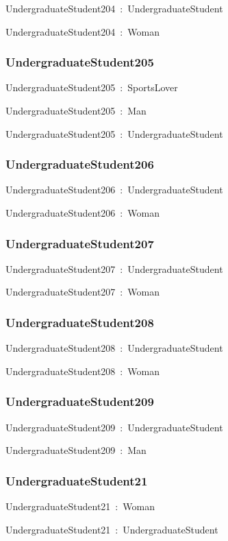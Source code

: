 \documentclass{article}
\begin{document}
UndergraduateStudent204~:~UndergraduateStudent

UndergraduateStudent204~:~Woman

\subsubsection*{UndergraduateStudent205}

UndergraduateStudent205~:~SportsLover

UndergraduateStudent205~:~Man

UndergraduateStudent205~:~UndergraduateStudent

\subsubsection*{UndergraduateStudent206}

UndergraduateStudent206~:~UndergraduateStudent

UndergraduateStudent206~:~Woman

\subsubsection*{UndergraduateStudent207}

UndergraduateStudent207~:~UndergraduateStudent

UndergraduateStudent207~:~Woman

\subsubsection*{UndergraduateStudent208}

UndergraduateStudent208~:~UndergraduateStudent

UndergraduateStudent208~:~Woman

\subsubsection*{UndergraduateStudent209}

UndergraduateStudent209~:~UndergraduateStudent

UndergraduateStudent209~:~Man

\subsubsection*{UndergraduateStudent21}

UndergraduateStudent21~:~Woman

UndergraduateStudent21~:~UndergraduateStudent
\end{document}
